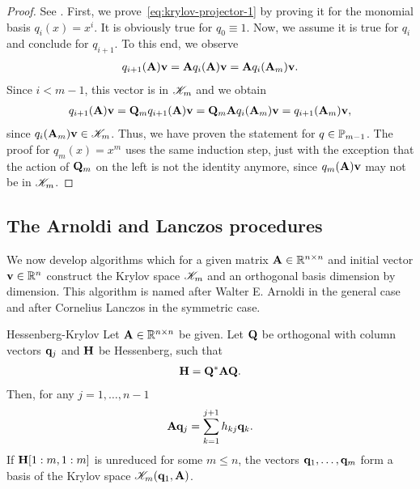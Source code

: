 \begin{proof}
  See \cite[Proposition 6.3]{Saad00}.  First, we
  prove~\eqref{eq:krylov-projector-1} by proving it for the monomial
  basis $q_i(x) = x^i$. It is obviously true for $q_0\equiv 1$. Now,
  we assume it is true for $q_i$ and conclude for $q_{i+1}$. To this
  end, we observe
  \begin{gather}
    q_{i+1}(\mata)\vv = \mata q_i(\mata)\vv = \mata q_i(\mata_m)\vv.
  \end{gather}
  Since $i<m-1$, this vector is in $\krylov_m$ and we obtain
  \begin{gather}
    q_{i+1}(\mata)\vv
    = \matq_m q_{i+1}(\mata)\vv
    = \matq_m \mata q_i(\mata_m)\vv
    = q_{i+1}(\mata_m)\vv,
  \end{gather}
  since $q_i(\mata_m)\vv\in\krylov_m$. Thus, we have proven the
  statement for $q\in\P_{m-1}$. The proof for $q_{m}(x) = x^m$ uses
  the same induction step, just with the exception that the action of
  $\matq_m$ on the left is not the identity anymore, since
  $q_m(\mata)\vv$ may not be in $\krylov_m$.
\end{proof}

\subsection{The Arnoldi and Lanczos procedures}

\begin{intro}
  We now develop algorithms which for a given matrix $\mata\in\Rnn$
  and initial vector $\vv\in\R^n$ construct the Krylov space
  $\krylov_m$ and an orthogonal basis dimension by dimension. This
  algorithm is named after Walter E. Arnoldi in the general case and
  after Cornelius Lanczos in the symmetric case.
\end{intro}

\begin{Lemma}{Hessenberg-Krylov}
  Let $\mata\in\Rnn$ be given. Let $\matq$ be orthogonal with column
  vectors $\vq_j$ and $\matH$ be Hessenberg, such that
  \begin{gather}
    \label{eq:krylov:1}
    \matH = \matq^*\mata\matq.
  \end{gather}
  Then, for any $j=1,\dots,n-1$
  \begin{gather}
    \label{eq:krylov:2}
    \mata\vq_j = \sum_{k=1}^{j+1} h_{kj}\vq_k.
  \end{gather}
  If $\matH[1:m,1:m]$ is unreduced for some $m\le n$, the vectors
  $\vq_1,\dots,\vq_m$ form a basis of the Krylov space
  $\krylov_{m}(\vq_1,\mata)$.
\end{Lemma}

